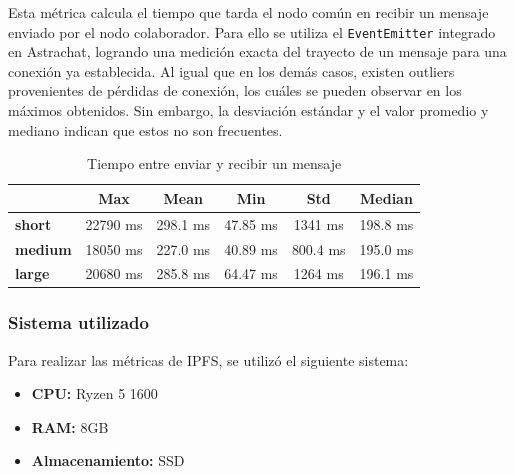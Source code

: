 Esta métrica calcula el tiempo que tarda el nodo común en recibir un mensaje enviado por el nodo colaborador. Para ello se utiliza el \texttt{EventEmitter} integrado en Astrachat, logrando una medición exacta del trayecto de un mensaje para una conexión ya establecida. Al igual que en los demás casos, existen outliers provenientes de pérdidas de conexión, los cuáles se pueden observar en los máximos obtenidos. Sin embargo, la desviación estándar y el valor promedio y mediano indican que estos no son frecuentes.

\setlength\tabcolsep{10pt}
\begin{table}[!htbp]
    \centering
    \begin{tabular}{|l|c|c|c|c|c|}
        \hline
        & \textbf{Max} & \textbf{Mean} & \textbf{Min} & \textbf{Std} & \textbf{Median} \\ \hline
        \textbf{short} & 22790 ms & 298.1 ms & 47.85 ms & 1341 ms & 198.8 ms \\ \hline
        \textbf{medium} & 18050 ms & 227.0 ms & 40.89 ms & 800.4 ms & 195.0 ms \\ \hline
        \textbf{large} & 20680 ms & 285.8 ms & 64.47 ms & 1264 ms & 196.1 ms \\ \hline
    \end{tabular}
    \caption{Tiempo entre enviar y recibir un mensaje}
\end{table}  

\subsubsection{Sistema utilizado}

Para realizar las métricas de IPFS, se utilizó el siguiente sistema:
\begin{itemize}
    \item \textbf{CPU:} Ryzen 5 1600
    \item \textbf{RAM:} 8GB
    \item \textbf{Almacenamiento:} SSD
\end{itemize}